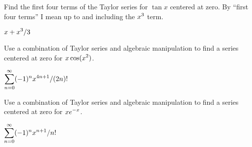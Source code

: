 \begin{exercises}
\begin{exercise} Find the first four terms of the Taylor series for $\tan
x$ centered at zero.  By ``first four terms'' I mean up to and including the $\displaystyle x^3$ term.
\begin{answer} $\displaystyle x+x^3/3$
\end{answer}\end{exercise}

\begin{exercise} Use a combination of Taylor series and algebraic
manipulation to find a series centered at zero for
$\displaystyle x\cos (x^2)$.
\begin{answer} $\displaystyle\sum_{n=0}^\infty (-1)^n x^{4n+1}/(2n)!$
\end{answer}\end{exercise}

\begin{exercise} Use a combination of Taylor series and algebraic
manipulation to find a series centered at zero for
$\displaystyle xe^{-x}$.
\begin{answer} $\displaystyle\sum_{n=0}^\infty (-1)^n x^{n+1}/n!$
\end{answer}\end{exercise}

\end{exercises}

